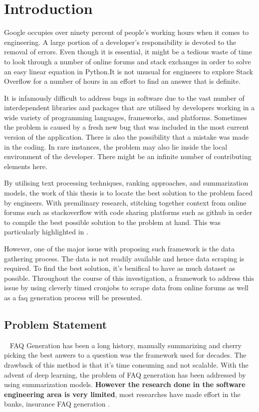 \chapter{Introduction}
Google occupies over ninety percent of people's working hours when it comes to engineering. A large portion of a developer's responsibility is devoted to the removal of errors. Even though it is essential, it might be a tedious waste of time to look through a number of online forums and stack exchanges in order to solve an easy linear equation in Python\cite{bugs_nightmare}.It is not unusual for engineers to explore Stack Overflow for a number of hours in an effort to find an answer that is definite.

It is infamously difficult to address bugs in software due to the vast number of interdependent libraries and packages that are utilised by developers working in a wide variety of programming languages, frameworks, and platforms. Sometimes the problem is caused by a fresh new bug that was included in the most current version of the application. There is also the possibility that a mistake was made in the coding. In rare instances, the problem may also lie inside the local environment of the developer. There might be an infinite number of contributing elements here.

By utilising text processing techniques, ranking approaches, and summarization models, the work of this thesis is to locate the best solution to the problem faced by engineers. With premilinary research, stitching together context from online forums such as stackoverflow with code sharing platforms such as github in order to compile the best possible solution to the problem at hand. This was particularly highlighted in \cite{8816796}. 

However, one of the major issue with proposing such framework is the data gathering process. The data is not readily available and hence data scraping is required. To find the best solution, it's benifical to have as much dataset as possible. Throughout the course of this investigation, a framework to address this issue by using cleverly timed cronjobs to scrape data from online forums as well as a faq generation process will be presented.

\vspace{1cm}
\pagebreak
\section{Problem Statement}~\label{ch:problem_statement}
FAQ Generation has been a long history, manually summarizing and cherry picking the best anwers to a question was the framework used for decades. The drawback of this method is that it's time consuming and not scalable\cite{}. With the advent of deep learning, the problem of FAQ generation has been addressed by using summarization models. \textbf{However the research done in the software engineering area is very limited}, most researches have made effort in the banks, insurance FAQ generation \cite{}. 

